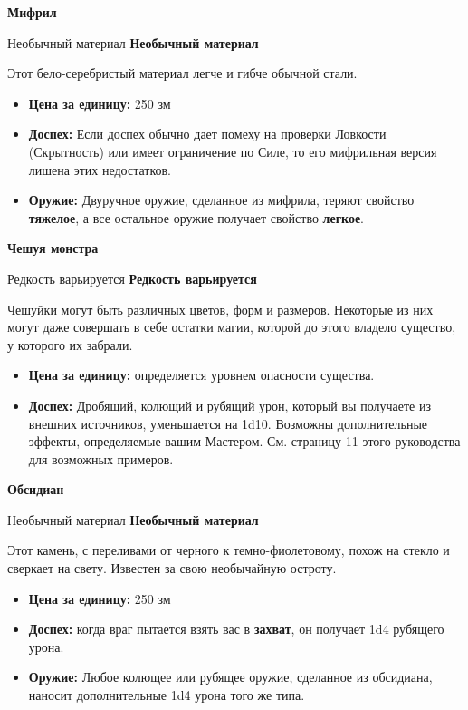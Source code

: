 \documentclass[a4paper, 9pt, twocolumn]{book}
\newcommand{\partc}[2][]{{
		\bigskip
		\noindent
		\hspace{-0.25cm}
		\fontsize{11pt}{13.2}
		\color{sectioncolor}
		\textbf{#2}}
	
	{
		\ifx\relax#1\relax
		\else
		\noindent
		\normalcolor
		\textbf{#1}}
	\bigskip
	\fi
}
\begin{document}
	\partc[Необычный материал]{Мифрил}
	
	\noindent Этот бело-серебристый материал легче и гибче обычной стали.
	
	\begin{itemize}
		\item \textbf{Цена за единицу:} 250 зм
		
		\item \textbf{Доспех:} Если доспех обычно дает помеху на проверки Ловкости (Скрытность) или имеет ограничение по Силе, то его мифрильная версия лишена этих недостатков.
		
		\item \textbf{Оружие:} Двуручное оружие, сделанное из мифрила, теряют свойство \textbf{тяжелое}, а все остальное оружие получает свойство \textbf{легкое}.
	\end{itemize}

	\partc[Редкость варьируется]{Чешуя монстра}
	
	\noindent Чешуйки могут быть различных цветов, форм и размеров. Некоторые из них могут даже совершать в себе остатки магии, которой до этого владело существо, у которого их забрали.
	
	\begin{itemize}
		\item \textbf{Цена за единицу:} определяется уровнем опасности существа.
		
		\item \textbf{Доспех:} Дробящий, колющий и рубящий урон, который вы получаете из внешних источников, уменьшается на 1d10. Возможны дополнительные эффекты, определяемые вашим Мастером. См. страницу 11 этого руководства для возможных примеров. %
	\end{itemize}

	\partc[Необычный материал]{Обсидиан}
	
	\noindent Этот камень, с переливами от черного к темно-фиолетовому, похож на стекло и сверкает на свету. Известен за свою необычайную остроту.
	
	\begin{itemize}
		\item \textbf{Цена за единицу:} 250 зм
		
		\item \textbf{Доспех:} когда враг пытается взять вас в \textbf{захват}, он получает 1d4 рубящего урона.
		
		\item \textbf{Оружие:} Любое колющее или рубящее оружие, сделанное из обсидиана, наносит дополнительные 1d4 урона того же типа. 
	\end{itemize}
\end{document}
